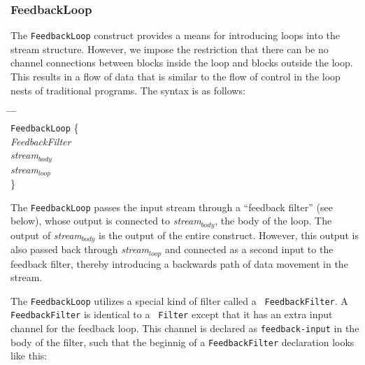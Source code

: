 \documentclass[draft]{article}
\begin{document}
\subsubsection{FeedbackLoop}

The {\tt FeedbackLoop} construct provides a means for introducing
loops into the stream structure.  However, we impose the restriction
that there can be no channel connections between blocks inside the
loop and blocks outside the loop.  This results in a flow of data that
is similar to the flow of control in the loop nests of traditional
programs.  The syntax is as follows:

\begin{tabbing}
\hspace{0.2in} \= \hspace{0.2in} \= \hspace{0.2in} \= \hspace{0.2in} \= \\

{\tt FeedbackLoop} \{ \\
\> {\it FeedbackFilter} \\
\> {\it stream$_{body}$} \\
\> {\it stream$_{loop}$} \\
\}
\end{tabbing}

The {\tt FeedbackLoop} passes the input stream through a ``feedback
filter'' (see below), whose output is connected to {\it
stream$_{body}$}, the body of the loop.  The output of {\it
stream$_{body}$} is the output of the entire construct.  However, this
output is also passed back through {\it stream$_{loop}$} and connected
as a second input to the feedback filter, thereby introducing a
backwards path of data movement in the stream.

\medskip
{}
\medskip

The {\tt FeedbackLoop} utilizes a special kind of filter called a {\tt
FeedbackFilter}.  A {\tt FeedbackFilter} is identical to a {\tt
Filter} except that it has an extra input channel for the feedback
loop.  This channel is declared as {\tt feedback-input} in the body of
the filter, such that the beginnig of a {\tt FeedbackFilter}
declaration looks like this:
\end{document}
